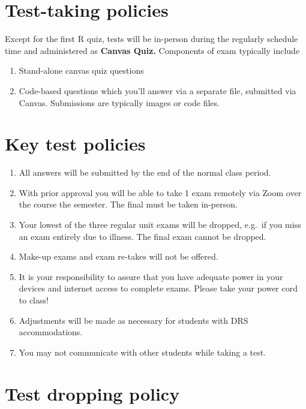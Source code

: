 \documentclass[
]{book}
\providecommand{\tightlist}{%
  \setlength{\itemsep}{0pt}\setlength{\parskip}{0pt}}
\begin{document}
\hypertarget{test-taking-policies}{%
\section{Test-taking policies}\label{test-taking-policies}}

Except for the first R quiz, tests will be in-person during the regularly schedule time and administered as \textbf{Canvas Quiz.} Components of exam typically include

\begin{enumerate}
\def\labelenumi{\arabic{enumi}.}
\tightlist
\item
  Stand-alone canvas quiz questions
\item
  Code-based questions which you'll answer via a separate file, submitted via Canvas. Submissions are typically images or code files.
\end{enumerate}

\hypertarget{key-test-policies}{%
\section{Key test policies}\label{key-test-policies}}

\begin{enumerate}
\def\labelenumi{\arabic{enumi}.}
\tightlist
\item
  All answers will be submitted by the end of the normal class period.
\item
  With prior approval you will be able to take 1 exam remotely via Zoom over the course the semester. The final must be taken in-person.
\item
  Your lowest of the three regular unit exams will be dropped, e.g.~if you miss an exam entirely due to illness. The final exam cannot be dropped.
\item
  Make-up exams and exam re-takes will not be offered.
\item
  It is your responsibility to assure that you have adequate power in your devices and internet access to complete exams. Please take your power cord to class!\\
\item
  Adjustments will be made as necessary for students with DRS accommodations.
\item
  You may not communicate with other students while taking a test.
\end{enumerate}

\hypertarget{test-dropping-policy}{%
\section{Test dropping policy}\label{test-dropping-policy}}
\end{document}
